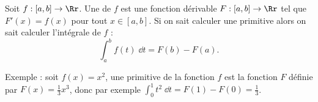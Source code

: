 \documentclass[11pt,class=report,crop=false]{standalone}
\begin{document}





\begin{cours}[Primitive]
Soit $f : [a,b] \to \Rr$. Une  de $f$ est une fonction dérivable 
$F : [a,b] \to \Rr$ tel que $F'(x) = f(x)$ pour tout $x\in [a,b]$.
Si on sait calculer une primitive alors on sait calculer l'intégrale de $f$ :
$$\int_a^b f(t) \;\dd t = F(b) - F(a).$$

Exemple : soit $f(x) = x^2$, une primitive de la fonction $f$ est la fonction $F$ définie par $F(x) = \frac13 x^3$, donc par exemple 
$\int_0^1 t^2\;\dd t = F(1)-F(0) = \frac13$.


\end{cours}

\end{document}

